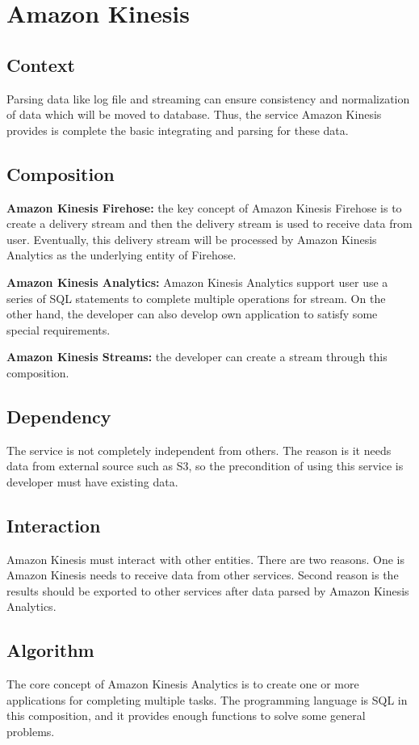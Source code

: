 \section{Amazon Kinesis}
	\subsection{Context}
    Parsing data like log file and streaming can ensure consistency and normalization of data which will be moved to database. Thus, the service Amazon Kinesis provides is complete the basic integrating and parsing for these data.
        
	\subsection{Composition}
    \textbf{Amazon Kinesis Firehose:} the key concept of Amazon Kinesis Firehose is to create a delivery stream and then the delivery stream is used to receive data from user. Eventually, this delivery stream will be processed by Amazon Kinesis Analytics as the underlying entity of Firehose\cite{z3}.
    
    \noindent \textbf{Amazon Kinesis Analytics:} Amazon Kinesis Analytics support user use a series of SQL statements to complete multiple operations for stream. On the other hand, the developer can also develop own application to satisfy some special requirements.
     
    \noindent \textbf{Amazon Kinesis Streams:} the developer can create a stream through this composition.

	\subsection{Dependency}
    The service is not completely independent from others. The reason is it needs data from external source such as S3, so the precondition of using this service is developer must have existing data.

	\subsection{Interaction}
    Amazon Kinesis must interact with other entities. There are two reasons. One is Amazon Kinesis needs to receive data from other services. Second reason is the results should be exported to other services after data parsed by Amazon Kinesis Analytics. 

	\subsection{Algorithm}
    The core concept of Amazon Kinesis Analytics is to create one or more applications for completing multiple tasks. The programming language is SQL in this composition, and it provides enough functions to solve some general problems.\\

